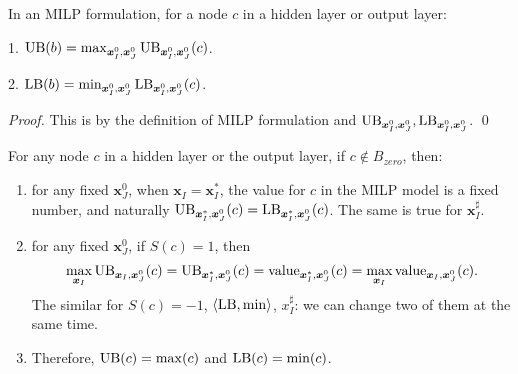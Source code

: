 			\begin{lemma} In an MILP formulation, for a node $c$ in a hidden layer or output layer:
				
				1. $\mathrm{UB}(b)=\max_{\boldsymbol{x}^0_I,\boldsymbol{x}^0_J}\mathrm{UB}_{\boldsymbol{x}^0_I,\boldsymbol{x}^0_J}(c)$. 
				
				2. $\mathrm{LB}(b)=\min_{\boldsymbol{x}^0_I,\boldsymbol{x}^0_J}\mathrm{LB}_{\boldsymbol{x}^0_I,\boldsymbol{x}^0_J}(c)$. 
			\end{lemma}
			
			\begin{proof}
				This is by the definition of MILP formulation and $\mathrm{UB}_{\boldsymbol{x}^0_I,\boldsymbol{x}^0_J}, \mathrm{LB}_{\boldsymbol{x}^0_I,\boldsymbol{x}^0_J}$. \qed
			\end{proof}
			
	
			
			
			
	

		\begin{lemma} \label{lem:main}
				For any node $c$ in a hidden layer or the output layer, if $c\notin B_{zero}$, then:		\begin{enumerate}
					\item for any fixed $\boldsymbol{x}^0_J$, when  $\boldsymbol{x}_I=\boldsymbol{x}^*_I$, the value for $c$ in the MILP model is a fixed number, and naturally $\mathrm{UB}_{\boldsymbol{x}^*_I,\boldsymbol{x}^0_J}(c)=\mathrm{LB}_{\boldsymbol{x}^*_I,\boldsymbol{x}^0_J}(c)$. The same is true for $\boldsymbol{x}^\sharp_I$.
					
					\item for any fixed $\boldsymbol{x}^0_J$, if $S(c)=1$, then $$\max_{\boldsymbol{x}_I} \mathrm{UB}_{\boldsymbol{x}_I,\boldsymbol{x}^0_J}(c)=\mathrm{UB}_{\boldsymbol{x}^*_I,\boldsymbol{x}^0_J}(c)= {\textrm{value}}_{\boldsymbol{x}^*_I,\boldsymbol{x}^0_J}(c) = \max_{\boldsymbol{x}_I} {\textrm{value}}_{\boldsymbol{x}_I,\boldsymbol{x}^0_J}(c).$$ The similar for $S(c)=-1$, $\langle \mathrm{LB},\min\rangle$, $x^\sharp_I$: we can change two of them at the same time.
					
					\item Therefore, $\mathrm{UB}(c)=\max(c)$ and $\mathrm{LB}(c)=\min(c)$.
				\end{enumerate}
				
				
				
			\end{lemma}
			


